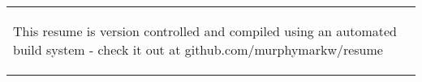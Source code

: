 \begin{tabularx}{\textwidth}{ X }
    \begin{footnotesize}
    This resume is version controlled and compiled using an automated build system - check it out at github.com/murphymarkw/resume
    \end{footnotesize}
\end{tabularx}

